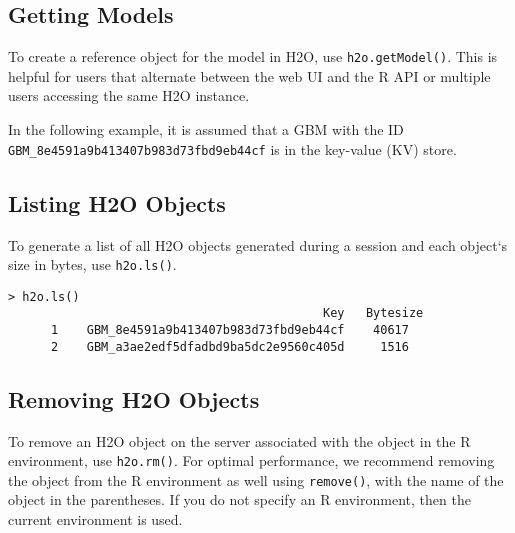 {{\waterExampleInR
\medskip



\subsection{Getting Models}


To create a reference object for the model in H2O, use {\texttt{h2o.getModel()}}. This is helpful for  users that alternate between the web UI and the R API or multiple users accessing the same H2O instance.

In the following example, it is assumed that a GBM with the ID \texttt{GBM\_8e4591a9b413407b983d73fbd9eb44cf} is in the key-value (KV) store.

\waterExampleInR
\medskip


\subsection{Listing H2O Objects}

To generate a list of all H2O objects generated during a session and each object`s size in bytes, use {\texttt{h2o.ls()}}.

\waterExampleInR
\medskip
\footnotesize
\begin{lstlisting}[style=R]
> h2o.ls()
                                            Key   Bytesize
      1    GBM_8e4591a9b413407b983d73fbd9eb44cf    40617
      2    GBM_a3ae2edf5dfadbd9ba5dc2e9560c405d     1516
\end{lstlisting}

\normalsize

\subsection{Removing H2O Objects}


To remove an H2O object on the server associated with the object in the R environment, use {\texttt{h2o.rm()}}. For optimal performance, we recommend removing the object from the R environment as well using {\texttt{remove()}}, with the name of the object in the parentheses. If you do not specify an R environment, then the current environment is used.

\waterExampleInR
\medskip


}}
